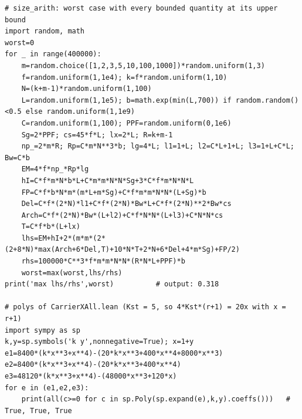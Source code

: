 \documentclass[11pt]{article}
\theoremstyle{remark}
\begin{document}
\begin{lstlisting}
# size_arith: worst case with every bounded quantity at its upper bound
import random, math
worst=0
for _ in range(400000):
    m=random.choice([1,2,3,5,10,100,1000])*random.uniform(1,3)
    f=random.uniform(1,1e4); k=f*random.uniform(1,10)
    N=(k+m-1)*random.uniform(1,100)
    L=random.uniform(1,1e5); b=math.exp(min(L,700)) if random.random()<0.5 else random.uniform(1,1e9)
    C=random.uniform(1,100); PPF=random.uniform(0,1e6)
    Sg=2*PPF; cs=45*f*L; lx=2*L; R=k+m-1
    np_=2*m*R; Rp=C*m*N**3*b; lg=4*L; l1=1+L; l2=C*L+1+L; l3=1+L+C*L; Bw=C*b
    EM=4*f*np_*Rp*lg
    hI=C*f*m*N*b*L+C*m*m*N*N*Sg+3*C*f*m*N*N*L
    FP=C*f*b*N*m*(m*L+m*Sg)+C*f*m*m*N*N*(L+Sg)*b
    Del=C*f*(2*N)*l1+C*f*(2*N)*Bw*L+C*f*(2*N)**2*Bw*cs
    Arch=C*f*(2*N)*Bw*(L+l2)+C*f*N*N*(L+l3)+C*N*N*cs
    T=C*f*b*(L+lx)
    lhs=EM+hI+2*(m*m*(2*(2+8*N)*max(Arch+6*Del,T)+10*N*T+2*N+6*Del+4*m*Sg)+FP/2)
    rhs=100000*C**3*f*m*m*N*N*(R*N*L+PPF)*b
    worst=max(worst,lhs/rhs)
print('max lhs/rhs',worst)          # output: 0.318

# polys of CarrierXAll.lean (Kst = 5, so 4*Kst*(r+1) = 20x with x = r+1)
import sympy as sp
k,y=sp.symbols('k y',nonnegative=True); x=1+y
e1=8400*(k*x**3+x**4)-(20*k*x**3+400*x**4+8000*x**3)
e2=8400*(k*x**3+x**4)-(20*k*x**3+400*x**4)
e3=48120*(k*x**3+x**4)-(48000*x**3+120*x)
for e in (e1,e2,e3):
    print(all(c>=0 for c in sp.Poly(sp.expand(e),k,y).coeffs()))   # True, True, True
\end{lstlisting}
\end{document}
